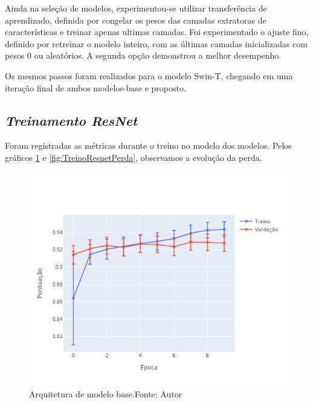 Ainda na seleção de modelos, experimentou-se utilizar transferência de aprendizado, definida por congelar os pesos das camadas extratoras de características e treinar apenas ultimas camadas. Foi experimentado o ajuste fino, definido por retreinar o modelo inteiro, com as últimas camadas inicializadas com pesos 0 ou aleatórios. A segunda opção demonstrou a melhor desempenho.


Os mesmos passos foram realizados para o modelo Swin-T, chegando em uma iteração final de ambos modelos-base e proposto.

\subsection{\textit{Treinamento ResNet}}\label{sec:Cap3_TrainResnet}
Foram registradas as métricas durante o treino no modelo dos modelos. Pelos gráficos \ref{fig:TreinoResnetScore} e \ref{fig:TreinoResnetPerda}, observamos a evolução da perda.



\begin{figure}[!ht]
    \centering
    \includegraphics[width=\columnwidth]{Imagens/results/rsp-resnet-50_planet_pt/pontuação em treino e validação por época.jpg}
    \caption{ Arquitetura de modelo base.Fonte: Autor}
    \label{fig:TreinoResnetScore}
\end{figure}  

